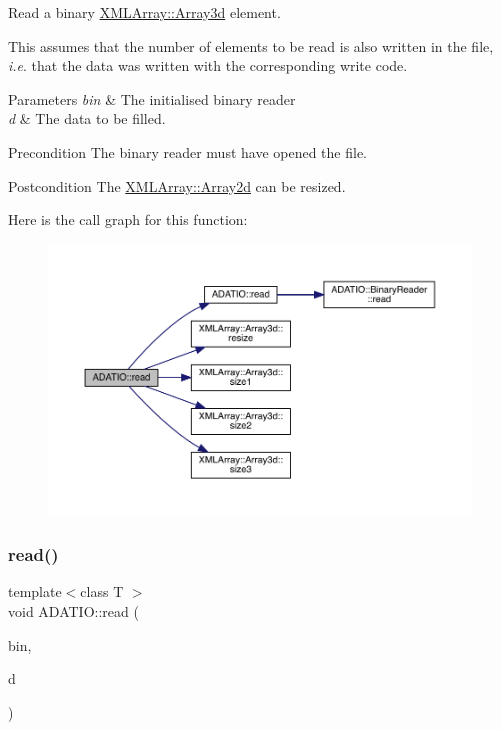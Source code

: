 Read a binary \mbox{\hyperlink{classXMLArray_1_1Array3d}{X\+M\+L\+Array\+::\+Array3d}} element. 

This assumes that the number of elements to be read is also written in the file, {\itshape i.\+e}. that the data was written with the corresponding write code. 
\begin{DoxyParams}{Parameters}
{\em bin} & The initialised binary reader \\
\hline
{\em d} & The data to be filled.\\
\hline
\end{DoxyParams}
\begin{DoxyPrecond}{Precondition}
The binary reader must have opened the file. 
\end{DoxyPrecond}
\begin{DoxyPostcond}{Postcondition}
The \mbox{\hyperlink{classXMLArray_1_1Array2d}{X\+M\+L\+Array\+::\+Array2d}} can be resized. 
\end{DoxyPostcond}
Here is the call graph for this function\+:\nopagebreak
\begin{figure}[H]
\begin{center}
\leavevmode
\includegraphics[width=350pt]{d0/dba/namespaceADATIO_ac8f475cc894abb16b89f3e73e1132bce_cgraph}
\end{center}
\end{figure}
\mbox{\label{namespaceADATIO_a0e3333d0774c69f2c6a38b013e23d02b}} 
\subsubsection{\texorpdfstring{read()}{read()}\hspace{0.1cm}{\footnotesize\ttfamily [22/28]}}
{\footnotesize\ttfamily template$<$class T $>$ \\
void A\+D\+A\+T\+I\+O\+::read (\begin{DoxyParamCaption}\item[{\mbox{\hyperlink{classADATIO_1_1BinaryReader}{Binary\+Reader}} \&}]{bin,  }\item[{\mbox{\hyperlink{classXMLArray_1_1Array4d}{X\+M\+L\+Array\+::\+Array4d}}$<$ T $>$ \&}]{d }\end{DoxyParamCaption})\hspace{0.3cm}{\ttfamily [inline]}}



